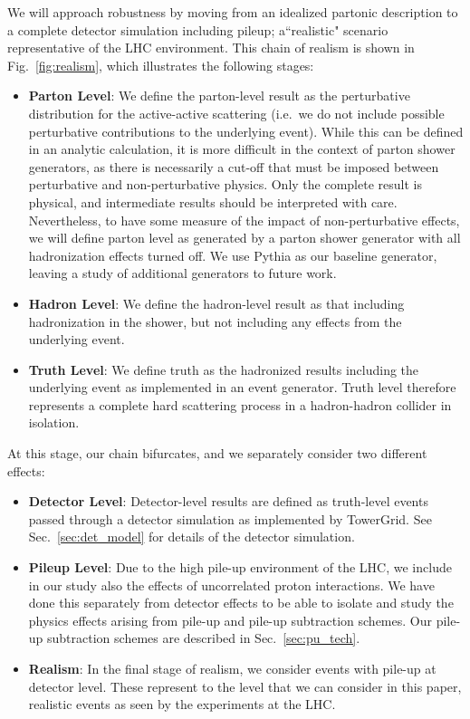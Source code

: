 \documentclass[11pt,letterpaper]{article}
\DeclareRobustCommand{\Sec}[1]{Sec.~\ref{#1}}
\DeclareRobustCommand{\Fig}[1]{Fig.~\ref{#1}}
\begin{document}
We will approach robustness by moving from an idealized partonic description to a complete detector simulation including pileup; a``realistic" scenario representative of the LHC environment.
%
This chain of realism is shown in \Fig{fig:realism}, which illustrates the following stages:
%
\begin{itemize}
\item {\bf Parton Level}: We define the parton-level result as the
  perturbative distribution for the active-active scattering (i.e.\ we
  do not include possible perturbative contributions to the underlying
  event).
  While this can be defined in an analytic calculation, it is
  more difficult in the context of parton shower generators, as
  there is necessarily a cut-off that must be imposed between
  perturbative and non-perturbative physics.
  Only the complete result
  is physical, and intermediate results should be interpreted with
  care.
  Nevertheless, to have some measure of the impact of
  non-perturbative effects, we will define parton level as generated
  by a parton shower generator with all hadronization effects turned
  off.
  We use Pythia  \cite{Sjostrand:2006za,Sjostrand:2007gs}  as our baseline generator, leaving a study of additional generators to future work.
%
\item {\bf Hadron Level}: We define the hadron-level result as that including hadronization in the shower, but not including any effects from the underlying event.
%
\item {\bf Truth Level}:  We define truth as the hadronized results including the underlying event as implemented in an event generator.
%
Truth level therefore represents a complete hard scattering process in a hadron-hadron collider in isolation.
%
\end{itemize}
At this stage, our chain bifurcates, and we separately consider two different effects:
\begin{itemize}
\item {\bf Detector Level}: Detector-level results are defined as truth-level events passed through a detector simulation as implemented by TowerGrid. See \Sec{sec:det_model} for details of the detector simulation.
%
\item {\bf Pileup Level}: Due to the high pile-up environment of the LHC, we include in our study also the effects of uncorrelated proton interactions. We have done this separately from detector effects to be able to isolate and study the physics effects arising from pile-up and pile-up subtraction schemes. Our pile-up subtraction schemes are described in \Sec{sec:pu_tech}.
%
\item {\bf Realism}: In the final stage of realism, we consider events with pile-up at detector
  level.
  These represent to the level that we can consider in this
  paper, realistic events as seen by the experiments at the
  LHC.
\end{itemize}
\end{document}
